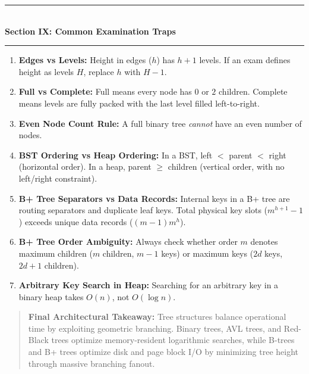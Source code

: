 \begin{center}
\vspace{1em}
{\color{primary}\rule{0.45\textwidth}{1.2pt}}\\[4pt]
{\Large\bfseries\color{primary} Section IX: Common Examination Traps}\\[2pt]
{\color{primary}\rule{0.45\textwidth}{1.2pt}}
\vspace{0.5em}
\end{center}

\begin{enumerate}
    \item \textbf{Edges vs Levels:} Height in edges ($h$) has $h + 1$ levels. If an exam defines height as levels $H$, replace $h$ with $H - 1$.
    \item \textbf{Full vs Complete:} Full means every node has $0$ or $2$ children. Complete means levels are fully packed with the last level filled left-to-right.
    \item \textbf{Even Node Count Rule:} A full binary tree \emph{cannot} have an even number of nodes.
    \item \textbf{BST Ordering vs Heap Ordering:} In a BST, left $<$ parent $<$ right (horizontal order). In a heap, parent $\geq$ children (vertical order, with no left/right constraint).
    \item \textbf{B+ Tree Separators vs Data Records:} Internal keys in a B+ tree are routing separators and duplicate leaf keys. Total physical key slots ($m^{h+1}-1$) exceeds unique data records ($(m-1)m^h$).
    \item \textbf{B+ Tree Order Ambiguity:} Always check whether order $m$ denotes maximum children ($m$ children, $m-1$ keys) or maximum keys ($2d$ keys, $2d+1$ children).
    \item \textbf{Arbitrary Key Search in Heap:} Searching for an arbitrary key in a binary heap takes $O(n)$, not $O(\log n)$.
\end{enumerate}

\begin{quote}
\textbf{Final Architectural Takeaway:} Tree structures balance operational time by exploiting geometric branching. Binary trees, AVL trees, and Red-Black trees optimize memory-resident logarithmic searches, while B-trees and B+ trees optimize disk and page block I/O by minimizing tree height through massive branching fanout.
\end{quote}
